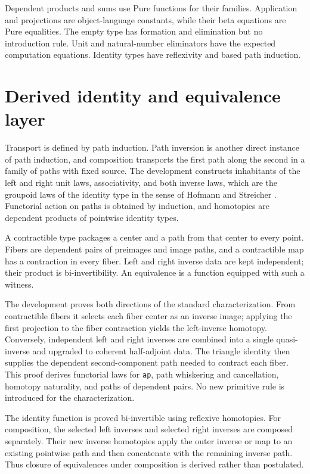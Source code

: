 \documentclass[11pt,a4paper]{article}
\begin{document}
Dependent products and sums use Pure functions for their families. Application
and projections are object-language constants, while their beta equations are
Pure equalities. The empty type has formation and elimination but no
introduction rule. Unit and natural-number eliminators have the expected
computation equations. Identity types have reflexivity and based path
induction.

\section{Derived identity and equivalence layer}

Transport is defined by path induction. Path inversion is another direct
instance of path induction, and composition transports the first path along
the second in a family of paths with fixed source. The development constructs
inhabitants of the left and right unit laws, associativity, and both inverse
laws, which are the groupoid laws of the identity type in the sense of
Hofmann and Streicher \cite{HofmannStreicher1998}. Functorial action on paths
is obtained by induction, and homotopies are dependent products of pointwise
identity types.

A contractible type packages a center and a path from that center to every
point. Fibers are dependent pairs of preimages and image paths, and a
contractible map has a contraction in every fiber. Left and right inverse data
are kept independent; their product is bi-invertibility. An equivalence is a
function equipped with such a witness.

The development proves both directions of the standard characterization. From
contractible fibers it selects each fiber center as an inverse image; applying
the first projection to the fiber contraction yields the left-inverse
homotopy. Conversely, independent left and right inverses are combined into a
single quasi-inverse and upgraded to coherent half-adjoint data. The triangle
identity then supplies the dependent second-component path needed to contract
each fiber. This proof derives functorial laws for \texttt{ap}, path
whiskering and cancellation, homotopy naturality, and paths of dependent pairs.
No new primitive rule is introduced for the characterization.

The identity function is proved bi-invertible using reflexive homotopies. For
composition, the selected left inverses and selected right inverses are
composed separately. Their new inverse homotopies apply the outer inverse or
map to an existing pointwise path and then concatenate with the remaining
inverse path. Thus closure of equivalences under composition is derived rather
than postulated.
\end{document}
